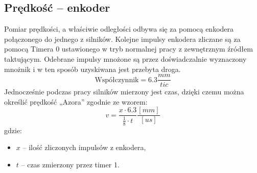     \subsection{Prędkość -- enkoder}
        \tab Pomiar prędkości, a właściwie odległości odbywa się za pomocą enkodera połączonego do jednego z silników.
        Kolejne impulsy enkodera zliczane są za pomocą Timera 0 ustawionego w tryb normalnej pracy z zewnętrznym źródłem taktującym.  %
        Odebrane impulsy mnożone są przez doświadczalnie wyznaczony mnożnik i w ten sposób uzyskiwana jest przebyta droga.
        \begin{equation*}
            \text{Współczynnik} = 6.3 \frac{mm}{tic}
        \end{equation*}
        Jednocześnie podczas pracy silników mierzony jest czas, dzięki czemu można określić prędkość „Azora” zgodnie ze wzorem:
        \begin{equation*}
            v = \frac{x\cdot 6.3}{\frac{1}{8}\cdot t}\frac{[mm]}{[us]}
        \end{equation*}
        gdzie:
        \begin{itemize}
            \item $x$ -- ilość zliczonych impulsów z enkodera,
            \item $t$ -- czas zmierzony przez timer 1.
        \end{itemize}
        
